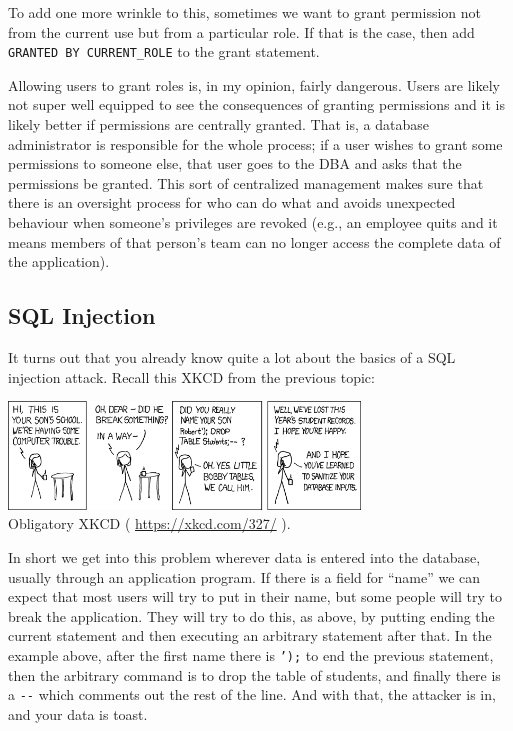 To add one more wrinkle to this, sometimes we want to grant permission not from the current use but from a particular role. If that is the case, then add \texttt{GRANTED BY CURRENT\_ROLE} to the grant statement. 

Allowing users to grant roles is, in my opinion, fairly dangerous. Users are likely not super well equipped to see the consequences of granting permissions and it is likely better if permissions are centrally granted. That is, a database administrator is responsible for the whole process; if a user wishes to grant some permissions to someone else, that user goes to the DBA and asks that the permissions be granted. This sort of centralized management makes sure that there is an oversight process for who can do what and avoids unexpected behaviour when someone's privileges are revoked (e.g., an employee quits and it means members of that person's team can no longer access the complete data of the application).

\subsection*{SQL Injection}

It turns out that you already know quite a lot about the basics of a SQL injection attack. Recall this XKCD from the previous topic:

\begin{center}
\includegraphics[width=0.7\textwidth]{images/exploits_of_a_mom}\\
Obligatory XKCD ( \url{https://xkcd.com/327/} ).
\end{center}

In short we get into this problem wherever data is entered into the database, usually through an application program. If there is a field for ``name'' we can expect that most users will try to put in their name, but some people will try to break the application. They will try to do this, as above, by putting ending the current statement and then executing an arbitrary statement after that. In the example above,  after the first name there is \texttt{');} to end the previous statement, then the arbitrary command is to drop the table of students, and finally there is a \texttt{-}\texttt{-} which comments out the rest of the line. And with that, the attacker is in, and your data is toast.

